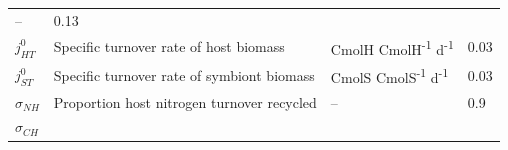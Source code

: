 \documentclass[]{elsarticle} %
\begin{document}
\begin{longtable}[c]{@{}llll@{}}
\begin{minipage}[t]{0.25\columnwidth}
--
\strut\end{minipage} &
\begin{minipage}[t]{0.10\columnwidth}\raggedright\strut
0.13
\strut\end{minipage}\tabularnewline
\begin{minipage}[t]{0.10\columnwidth}\raggedright\strut
\(j_{HT}^0\)
\strut\end{minipage} &
\begin{minipage}[t]{0.48\columnwidth}\raggedright\strut
Specific turnover rate of host biomass
\strut\end{minipage} &
\begin{minipage}[t]{0.25\columnwidth}\raggedright\strut
CmolH CmolH\textsuperscript{-1} d\textsuperscript{-1}
\strut\end{minipage} &
\begin{minipage}[t]{0.10\columnwidth}\raggedright\strut
0.03
\strut\end{minipage}\tabularnewline
\begin{minipage}[t]{0.10\columnwidth}\raggedright\strut
\(j_{ST}^0\)
\strut\end{minipage} &
\begin{minipage}[t]{0.48\columnwidth}\raggedright\strut
Specific turnover rate of symbiont biomass
\strut\end{minipage} &
\begin{minipage}[t]{0.25\columnwidth}\raggedright\strut
CmolS CmolS\textsuperscript{-1} d\textsuperscript{-1}
\strut\end{minipage} &
\begin{minipage}[t]{0.10\columnwidth}\raggedright\strut
0.03
\strut\end{minipage}\tabularnewline
\begin{minipage}[t]{0.10\columnwidth}\raggedright\strut
\(\sigma_{NH}\)
\strut\end{minipage} &
\begin{minipage}[t]{0.48\columnwidth}\raggedright\strut
Proportion host nitrogen turnover recycled
\strut\end{minipage} &
\begin{minipage}[t]{0.25\columnwidth}\raggedright\strut
--
\strut\end{minipage} &
\begin{minipage}[t]{0.10\columnwidth}\raggedright\strut
0.9
\strut\end{minipage}\tabularnewline
\begin{minipage}[t]{0.10\columnwidth}\raggedright\strut
\(\sigma_{CH}\)
\strut\end{minipage} &

\end{longtable}
\end{document}

